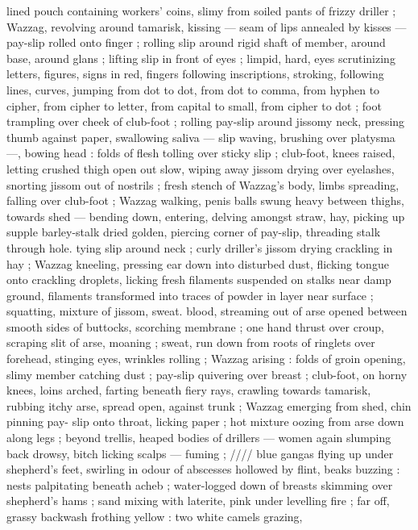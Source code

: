 lined pouch containing workers’ coins, slimy from soiled pants of
frizzy driller ; Wazzag, revolving around tamarisk, kissing --- seam of
lips annealed by kisses --- pay-slip rolled onto finger ; rolling slip
around rigid shaft of member, around base, around glans ; lifting slip
in front of eyes ; limpid, hard, eyes scrutinizing letters, figures, signs
in red, fingers following inscriptions, stroking, following lines,
curves, jumping from dot to dot, from dot to comma, from hyphen to
cipher, from cipher to letter, from capital to small, from cipher to dot
; foot trampling over cheek of club-foot ; rolling pay-slip around
jissomy neck, pressing thumb against paper, swallowing saliva ---
slip waving, brushing over platysma ---, bowing head : folds of flesh
tolling over sticky slip ; club-foot, knees raised, letting crushed thigh
open out slow, wiping away jissom drying over eyelashes, snorting
jissom out of nostrils ; fresh stench of Wazzag's body, limbs
spreading, falling over club-foot ; Wazzag walking, penis balls swung
heavy between thighs, towards shed --- bending down, entering,
delving amongst straw, hay, picking up supple barley-stalk dried
golden, piercing corner of pay-slip, threading stalk through hole.
tying slip around neck ; curly driller's jissom drying crackling in hay
; Wazzag kneeling, pressing ear down into disturbed dust, flicking
tongue onto crackling droplets, licking fresh filaments suspended on
stalks near damp ground, filaments transformed into traces of
powder in layer near surface ; squatting, mixture of jissom, sweat.
blood, streaming out of arse opened between smooth sides of
buttocks, scorching membrane ; one hand thrust over croup, scraping
slit of arse, moaning ; sweat, run down from roots of ringlets over
forehead, stinging eyes, wrinkles rolling ; Wazzag arising : folds of
groin opening, slimy member catching dust ; pay-slip quivering over
breast ; club-foot, on horny knees, loins arched, farting beneath
fiery rays, crawling towards tamarisk, rubbing itchy arse, spread
open, against trunk ; Wazzag emerging from shed, chin pinning pay-
slip onto throat, licking paper ; hot mixture oozing from arse down
along legs ; beyond trellis, heaped bodies of drillers --- women
again slumping back drowsy, bitch licking scalps --- fuming ; //// blue
gangas flying up under shepherd's feet, swirling in odour of
abscesses hollowed by flint, beaks buzzing : nests palpitating
beneath acheb ; water-logged down of breasts skimming over
shepherd’s hams ; sand mixing with laterite, pink under levelling fire
; far off, grassy backwash frothing yellow : two white camels grazing,

